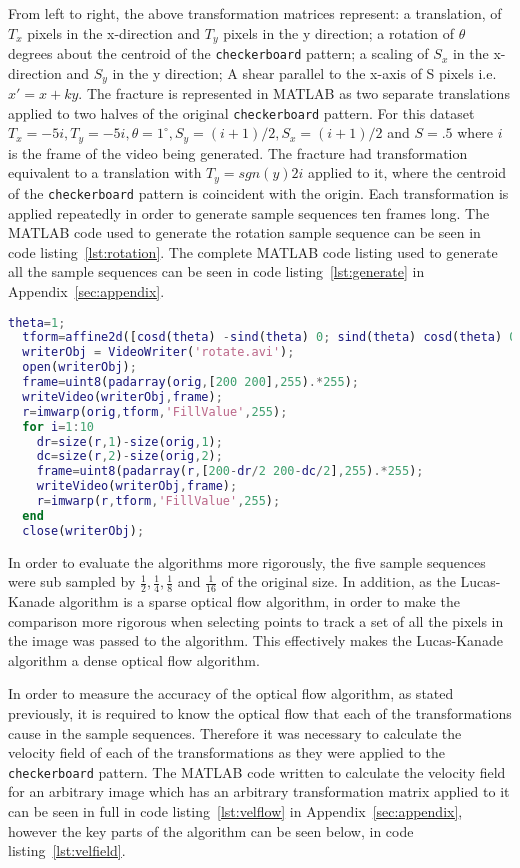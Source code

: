 From left to right, the above transformation matrices represent: a translation, of $T_x$ pixels in the x-direction and $T_y$ pixels in the y direction; a rotation of $\theta$ degrees about the centroid of the \verb|checkerboard| pattern; a scaling of $S_x$ in the x-direction and $S_y$ in the y direction; A shear parallel to the x-axis of S pixels i.e. $x' = x + ky$. The fracture is represented in MATLAB as two separate translations applied to two halves of the original \verb|checkerboard| pattern. For this dataset $T_x = -5i, T_y = -5i, \theta = 1^\circ, S_y = (i+1)/2, S_x = (i+1)/2$ and $S = .5$ where $i$ is the frame of the video being generated. The fracture had transformation equivalent to a translation with $T_y = sgn(y)2i$ applied to it, where the centroid of the \verb|checkerboard| pattern is coincident with the origin. Each transformation is applied repeatedly in order to generate sample sequences ten frames long. The MATLAB code used to generate the rotation sample sequence can be seen in code listing~\ref{lst:rotation}. The complete MATLAB code listing used to generate all the sample sequences can be seen in code listing~\ref{lst:generate} in Appendix~\ref{sec:appendix}.

\singlespacing
\begin{lstlisting}[language=MATLAB,caption={MATLAB code for creating rotation sample sequence},label=lst:rotation]
  theta=1;
  tform=affine2d([cosd(theta) -sind(theta) 0; sind(theta) cosd(theta) 0; 0 0 1]);
  writerObj = VideoWriter('rotate.avi');
  open(writerObj);
  frame=uint8(padarray(orig,[200 200],255).*255);
  writeVideo(writerObj,frame);
  r=imwarp(orig,tform,'FillValue',255);
  for i=1:10
    dr=size(r,1)-size(orig,1);
    dc=size(r,2)-size(orig,2);
    frame=uint8(padarray(r,[200-dr/2 200-dc/2],255).*255);
    writeVideo(writerObj,frame);
    r=imwarp(r,tform,'FillValue',255);
  end
  close(writerObj);
\end{lstlisting}
\onehalfspacing

In order to evaluate the algorithms more rigorously, the five sample sequences were sub sampled by $\frac{1}{2}, \frac{1}{4}, \frac{1}{8}$ and $\frac{1}{16}$ of the original size. In addition, as the Lucas-Kanade algorithm is a sparse optical flow algorithm, in order to make the comparison more rigorous when selecting points to track a set of all the pixels in the image was passed to the algorithm. This effectively makes the Lucas-Kanade algorithm a dense optical flow algorithm.

In order to measure the accuracy of the optical flow algorithm, as stated previously, it is required to know the optical flow that each of the transformations cause in the sample sequences. Therefore it was necessary to calculate the velocity field of each of the transformations as they were applied to the \verb|checkerboard| pattern. The MATLAB code written to calculate the velocity field for an arbitrary image which has an arbitrary transformation matrix applied to it can be seen in full in code listing~\ref{lst:velflow} in Appendix~\ref{sec:appendix}, however the key parts of the algorithm can be seen below, in code listing~\ref{lst:velfield}.


